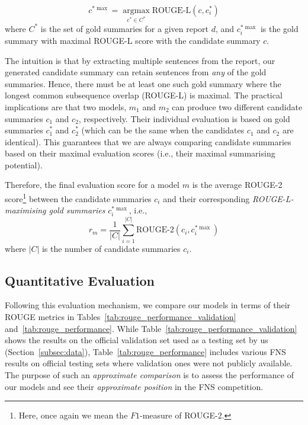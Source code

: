 \begin{equation}\label{eq:rouge_max}
    c^{*\max} = \underset{c^{*} \in C^{*}}{\operatorname{argmax}} \text{ROUGE-L}(c, c^{*}_{i})
\end{equation}
where $C^{*}$ is the set of gold summaries for a given report $d$, and $c^{*\max}_{i}$ is the gold summary with maximal ROUGE-L score with the candidate summary $c$.

The intuition is that by extracting multiple sentences from the report, our generated candidate summary can
retain sentences from \emph{any} of the gold summaries.
Hence, there must be at least one such gold summary where the longest common subsequence overlap (ROUGE-L) is maximal.
The practical implications are that two models, $m_{1}$ and $m_{2}$ can produce two different candidate summaries
$c_{1}$ and $c_{2}$, respectively.
Their individual evaluation is based on gold summaries $c^{*}_{1}$ and $c^{*}_{2}$ (which can be the same when the
candidates $c_{1}$ and $c_{2}$ are identical).
This guarantees that we are always comparing candidate summaries based on their maximal evaluation scores (i.e., their maximal summarising potential).

Therefore, the final evaluation score for a model $m$ is the average ROUGE-2 score\footnote{
    Here, once again we mean the $F1$-measure of ROUGE-2.
} between the candidate summaries $c_{i}$ and their corresponding \emph{ROUGE-L-maximising gold summaries} $c^{*\max}_{i}$, i.e.,
\begin{equation}\label{eq:rouge_final}
    r_{m} = \frac{1}{|C|} \sum_{i=1}^{|C|} \text{ROUGE-2}(c_{i}, c^{*\max}_{i})
\end{equation}
where $|C|$ is the number of candidate summaries $c_{i}$.

\subsection{Quantitative Evaluation}\label{subsec:quantitative-evaluation}
Following this evaluation mechanism, we compare our models in terms of their ROUGE metrics in Tables~\ref{tab:rouge_performance_validation} and~\ref{tab:rouge_performance}.
While Table~\ref{tab:rouge_performance_validation} shows the results on the official validation set used as a testing set by us (Section~\ref{subsec:data}),
Table~\ref{tab:rouge_performance} includes various FNS results on official testing sets where validation ones were not publicly available.
The purpose of such an \emph{approximate comparison} is to assess the performance of our models and see their \emph{approximate position} in the FNS competition.


